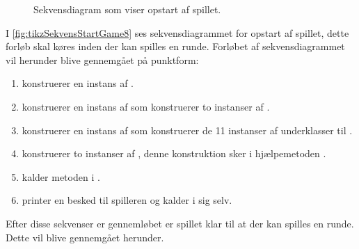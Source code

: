 \begin{figure}
\caption{Sekvensdiagram som viser opstart af spillet.}\label{fig:tikzSekvensStartGame8}
\centering

\end{figure}

I \vref{fig:tikzSekvensStartGame8} ses sekvensdiagrammet for opstart af spillet, dette forløb skal køres inden der kan spilles en runde. Forløbet af sekvensdiagrammet vil herunder blive gennemgået på punktform:
\begin{enumerate}
\item {} konstruerer en instans af .
\item {} konstruerer en instans af  som konstruerer to instanser af .
\item {} konstruerer en instans af  som konstruerer de 11 instanser af underklasser til .
\item {} konstruerer to instanser af , denne konstruktion sker i hjælpemetoden .
\item {} kalder metoden  i .
\item {} printer en besked til spilleren og kalder  i sig selv.
\end{enumerate}

Efter disse sekvenser er gennemløbet er spillet klar til at der kan spilles en runde. Dette vil blive gennemgået herunder.

